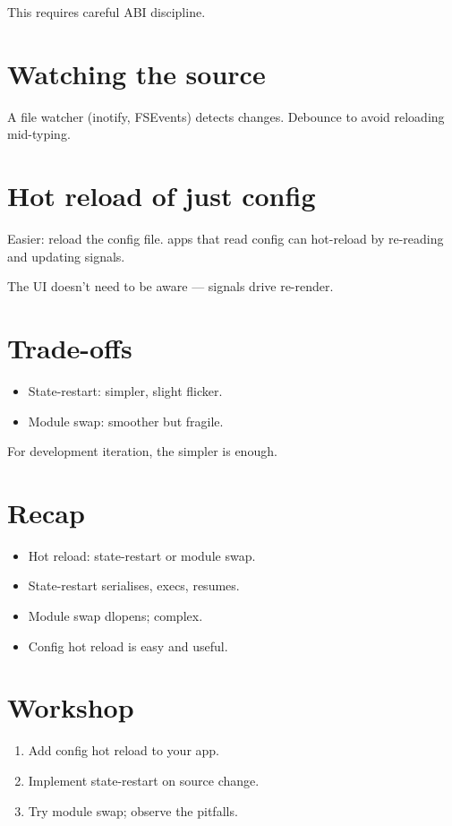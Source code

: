 This requires careful ABI discipline.

\section{Watching the source}

A file watcher (inotify, FSEvents) detects changes. Debounce
to avoid reloading mid-typing.

\section{Hot reload of just config}

Easier: reload the config file. \maya{} apps that read
config can hot-reload by re-reading and updating signals.

The UI doesn't need to be aware --- signals drive
re-render.

\section{Trade-offs}

\begin{itemize}[leftmargin=*]
  \item State-restart: simpler, slight flicker.
  \item Module swap: smoother but fragile.
\end{itemize}

For development iteration, the simpler is enough.

\section{Recap}

\begin{recap}
\begin{itemize}[leftmargin=*]
  \item Hot reload: state-restart or module swap.
  \item State-restart serialises, execs, resumes.
  \item Module swap dlopens; complex.
  \item Config hot reload is easy and useful.
\end{itemize}
\end{recap}

\section*{Workshop}

\begin{enumerate}[leftmargin=*]
  \item Add config hot reload to your app.
  \item Implement state-restart on source change.
  \item Try module swap; observe the pitfalls.
\end{enumerate}
